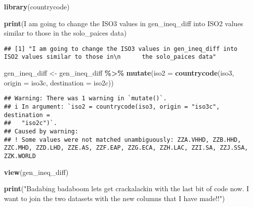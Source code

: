 \documentclass[
]{article}
\newenvironment{Shaded}{\begin{snugshade}}{\end{snugshade}}
\newcommand{\AttributeTok}[1]{\textcolor[rgb]{0.13,0.29,0.53}{#1}}
\newcommand{\FunctionTok}[1]{\textcolor[rgb]{0.13,0.29,0.53}{\textbf{#1}}}
\newcommand{\NormalTok}[1]{#1}
\newcommand{\OtherTok}[1]{\textcolor[rgb]{0.56,0.35,0.01}{#1}}
\newcommand{\SpecialCharTok}[1]{\textcolor[rgb]{0.81,0.36,0.00}{\textbf{#1}}}
\newcommand{\StringTok}[1]{\textcolor[rgb]{0.31,0.60,0.02}{#1}}
\begin{document}
\begin{Shaded}
\begin{Highlighting}[]
\FunctionTok{library}\NormalTok{(countrycode)}

\FunctionTok{print}\NormalTok{(}\StringTok{\textquotesingle{}I am going to change the ISO3 values in gen\_ineq\_diff into ISO2 values similar to those in}
\StringTok{      the solo\_paices data\textquotesingle{}}\NormalTok{)}
\end{Highlighting}
\end{Shaded}

\begin{verbatim}
## [1] "I am going to change the ISO3 values in gen_ineq_diff into ISO2 values similar to those in\n      the solo_paices data"
\end{verbatim}

\begin{Shaded}
\begin{Highlighting}[]
\NormalTok{gen\_ineq\_diff }\OtherTok{\textless{}{-}}\NormalTok{ gen\_ineq\_diff }\SpecialCharTok{\%\textgreater{}\%}
  \FunctionTok{mutate}\NormalTok{(}\AttributeTok{iso2 =} \FunctionTok{countrycode}\NormalTok{(iso3, }\AttributeTok{origin =} \StringTok{\textquotesingle{}iso3c\textquotesingle{}}\NormalTok{, }\AttributeTok{destination =} \StringTok{\textquotesingle{}iso2c\textquotesingle{}}\NormalTok{))}
\end{Highlighting}
\end{Shaded}

\begin{verbatim}
## Warning: There was 1 warning in `mutate()`.
## i In argument: `iso2 = countrycode(iso3, origin = "iso3c", destination =
##   "iso2c")`.
## Caused by warning:
## ! Some values were not matched unambiguously: ZZA.VHHD, ZZB.HHD, ZZC.MHD, ZZD.LHD, ZZE.AS, ZZF.EAP, ZZG.ECA, ZZH.LAC, ZZI.SA, ZZJ.SSA, ZZK.WORLD
\end{verbatim}

\begin{Shaded}
\begin{Highlighting}[]
\FunctionTok{view}\NormalTok{(gen\_ineq\_diff)}
\end{Highlighting}
\end{Shaded}

\begin{Shaded}
\begin{Highlighting}[]
\FunctionTok{print}\NormalTok{(}\StringTok{"Badabing badaboom let\textquotesingle{}s get crackalackin with the last bit of code now. I want to join}
\StringTok{      the two datasets with the new columns that I have made!!"}\NormalTok{)}
\end{Highlighting}
\end{Shaded}
\end{document}
